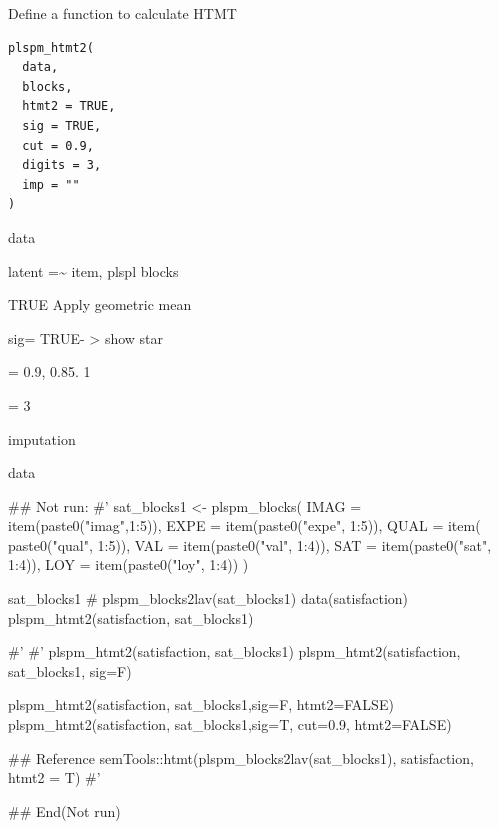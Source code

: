 \documentclass[a4paper]{book}
\begin{document}
%
\begin{Description}
Define a function to calculate HTMT
\end{Description}
%
\begin{Usage}
\begin{verbatim}
plspm_htmt2(
  data,
  blocks,
  htmt2 = TRUE,
  sig = TRUE,
  cut = 0.9,
  digits = 3,
  imp = ""
)
\end{verbatim}
\end{Usage}
%
\begin{Arguments}
\begin{ldescription}
\item[\code{data}] data

\item[\code{blocks}] latent =\textasciitilde{} item, plspl blocks

\item[\code{htmt2}] TRUE Apply geometric mean

\item[\code{sig}] sig= TRUE- > show star

\item[\code{cut}] = 0.9, 0.85. 1

\item[\code{digits}] = 3

\item[\code{imp}] imputation
\end{ldescription}
\end{Arguments}
%
\begin{Value}
data
\end{Value}
%
\begin{Examples}
\begin{ExampleCode}

\#\# Not run: 
#'
sat_blocks1 <- plspm_blocks(
  IMAG = item(paste0("imag",1:5)),
  EXPE = item(paste0("expe", 1:5)),
  QUAL = item( paste0("qual", 1:5)),
  VAL = item(paste0("val", 1:4)),
  SAT = item(paste0("sat", 1:4)),
  LOY = item(paste0("loy", 1:4))
)

sat_blocks1
# plspm_blocks2lav(sat_blocks1) %
data(satisfaction)
plspm_htmt2(satisfaction, sat_blocks1)

#'
#'
plspm_htmt2(satisfaction, sat_blocks1)
plspm_htmt2(satisfaction, sat_blocks1, sig=F)

plspm_htmt2(satisfaction, sat_blocks1,sig=F, htmt2=FALSE)
plspm_htmt2(satisfaction, sat_blocks1,sig=T, cut=0.9, htmt2=FALSE)

## Reference
semTools::htmt(plspm_blocks2lav(sat_blocks1),
               satisfaction,
               htmt2 = T)
#'


## End(Not run)

\end{ExampleCode}
\end{Examples}
\end{document}
